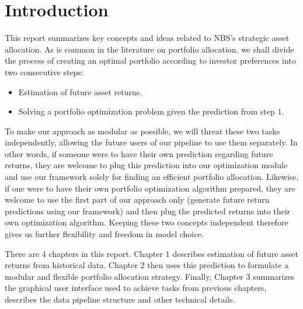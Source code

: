 \chapter*{Introduction}
\label{chapter:introduction}

This report summarizes key concepts and ideas related to NBS's strategic asset allocation. As is common in the literature on portfolio allocation, we shall divide the process of creating an optimal portfolio according to investor preferences into two consecutive steps:
\begin{itemize}
	\item Estimation of future asset returns.
	\item Solving a portfolio optimization problem given the prediction from step 1.
\end{itemize}
To make our approach as modular as possible, we will threat these two tasks independently, allowing the future users of our pipeline to use them separately. In other words, if someone were to have their own prediction regarding future returns, they are welcome to plug this prediction into our optimization module and use our framework solely for finding an efficient portfolio allocation. Likewise, if one were to have their own portfolio optimization algorithm prepared, they are welcome to use the first part of our approach only (generate future return predictions using our framework) and then plug the predicted returns into their own optimization algorithm. Keeping these two concepts independent therefore gives us further flexibility and freedom in model choice.

There are 4 chapters in this report. Chapter 1 describes estimation of future asset returns from historical data. Chapter 2 then uses this prediction to formulate a modular and flexible portfolio allocation strategy. Finally, Chapter 3 summarizes the graphical user interface used to achieve tasks from previous chapters, describes the data pipeline structure and other technical details.




